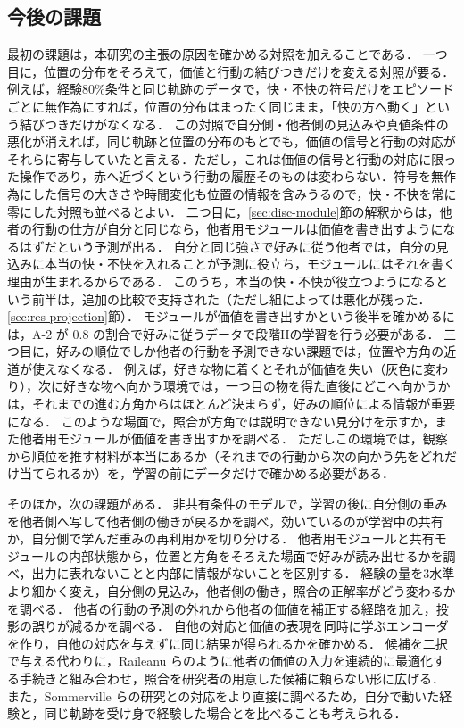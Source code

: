 \subsection{今後の課題}\label{sec:future}
最初の課題は，本研究の主張の原因を確かめる対照を加えることである．
一つ目に，位置の分布をそろえて，価値と行動の結びつきだけを変える対照が要る．
例えば，経験80\%条件と同じ軌跡のデータで，快・不快の符号だけをエピソードごとに無作為にすれば，位置の分布はまったく同じまま，「快の方へ動く」という結びつきだけがなくなる．
この対照で自分側・他者側の見込みや真値条件の悪化が消えれば，同じ軌跡と位置の分布のもとでも，価値の信号と行動の対応がそれらに寄与していたと言える．ただし，これは価値の信号と行動の対応に限った操作であり，赤へ近づくという行動の履歴そのものは変わらない．符号を無作為にした信号の大きさや時間変化も位置の情報を含みうるので，快・不快を常に零にした対照も並べるとよい．
二つ目に，\ref{sec:disc-module}節の解釈からは，他者の行動の仕方が自分と同じなら，他者用モジュールは価値を書き出すようになるはずだという予測が出る．
自分と同じ強さで好みに従う他者では，自分の見込みに本当の快・不快を入れることが予測に役立ち，モジュールにはそれを書く理由が生まれるからである．
このうち，本当の快・不快が役立つようになるという前半は，追加の比較で支持された（ただし組によっては悪化が残った．\ref{sec:res-projection}節）．
モジュールが価値を書き出すかという後半を確かめるには，A-2 が 0.8 の割合で好みに従うデータで段階IIの学習を行う必要がある．
三つ目に，好みの順位でしか他者の行動を予測できない課題では，位置や方角の近道が使えなくなる．
例えば，好きな物に着くとそれが価値を失い（灰色に変わり），次に好きな物へ向かう環境では，一つ目の物を得た直後にどこへ向かうかは，それまでの進む方角からはほとんど決まらず，好みの順位による情報が重要になる．
このような場面で，照合が方角では説明できない見分けを示すか，また他者用モジュールが価値を書き出すかを調べる．
ただしこの環境では，観察から順位を推す材料が本当にあるか（それまでの行動から次の向かう先をどれだけ当てられるか）を，学習の前にデータだけで確かめる必要がある．

そのほか，次の課題がある．
非共有条件のモデルで，学習の後に自分側の重みを他者側へ写して他者側の働きが戻るかを調べ，効いているのが学習中の共有か，自分側で学んだ重みの再利用かを切り分ける．
他者用モジュールと共有モジュールの内部状態から，位置と方角をそろえた場面で好みが読み出せるかを調べ，出力に表れないことと内部に情報がないことを区別する．
経験の量を3水準より細かく変え，自分側の見込み，他者側の働き，照合の正解率がどう変わるかを調べる．
他者の行動の予測の外れから他者の価値を補正する経路を加え，投影の誤りが減るかを調べる．
自他の対応と価値の表現を同時に学ぶエンコーダを作り，自他の対応を与えずに同じ結果が得られるかを確かめる．
候補を二択で与える代わりに，Raileanu ら\cite{raileanu2018modeling}のように他者の価値の入力を連続的に最適化する手続きと組み合わせ，照合を研究者の用意した候補に頼らない形に広げる．
また，Sommerville らの研究との対応をより直接に調べるため，自分で動いた経験と，同じ軌跡を受け身で経験した場合とを比べることも考えられる．
